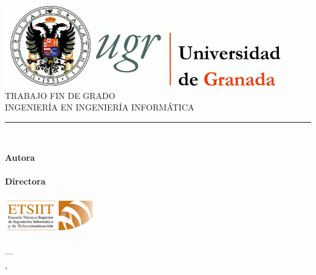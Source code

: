 \begin{titlepage}
 
 
\newlength{\centeroffset}
\setlength{\centeroffset}{-0.5\oddsidemargin}
\addtolength{\centeroffset}{0.5\evensidemargin}
\thispagestyle{empty}

\noindent\hspace*{\centeroffset}\begin{minipage}{\textwidth}

\centering
\includegraphics[width=0.9\textwidth]{imagenes/logo_ugr.jpg}\\[1.4cm]

\textsc{ \Large TRABAJO FIN DE GRADO\\[0.2cm]}
\textsc{ INGENIERÍA EN INGENIERÍA INFORMÁTICA}\\[1cm]
% 
{\Huge\bfseries \myTitle}
\noindent\rule[-1ex]{\textwidth}{3pt}\\[3.5ex]
{\large\bfseries \mySubTitle}
\end{minipage}

\vspace{2.5cm}
\noindent\hspace*{\centeroffset}\begin{minipage}{\textwidth}
\centering

\textbf{Autora}\\ {\myName}\\[2.5ex]
\textbf{Directora}\\
{\myProf}\\[2cm]
\includegraphics[width=0.3\textwidth]{imagenes/etsiit_logo.png}\\[0.1cm]
\textsc{\myFaculty}\\
\textsc{---}\\
\textsc{\myLocation, \myTime}
\end{minipage}
\end{titlepage}


